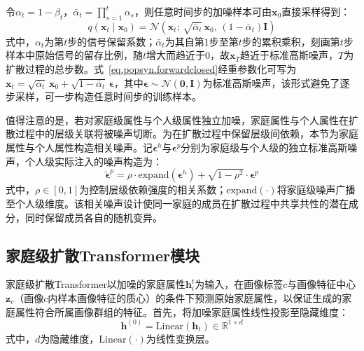 令$\alpha_t = 1 - \beta_t$，$\bar{\alpha}_t = \prod_{s=1}^{t}\alpha_s$，则任意时间步的加噪样本可由$\mathbf{x}_0$直接采样得到：
\begin{equation}
  q(\mathbf{x}_t \mid \mathbf{x}_0) = \mathcal{N}\left(\mathbf{x}_t;\, \sqrt{\bar{\alpha}_t}\,\mathbf{x}_0,\, (1-\bar{\alpha}_t)\mathbf{I}\right)
  \label{eq.popsyn.forwardclosed}
\end{equation}
式中，$\alpha_t$为第$t$步的信号保留系数；$\bar{\alpha}_t$为其自第$1$步至第$t$步的累积乘积，刻画第$t$步样本中原始信号的留存比例，随$t$增大而趋近于$0$，故$\mathbf{x}_T$趋近于标准高斯噪声，$T$为扩散过程的总步数。式~\eqref{eq.popsyn.forwardclosed}经重参数化可写为$\mathbf{x}_t = \sqrt{\bar{\alpha}_t}\,\mathbf{x}_0 + \sqrt{1-\bar{\alpha}_t}\,\boldsymbol{\epsilon}$，其中$\boldsymbol{\epsilon} \sim \mathcal{N}(\mathbf{0}, \mathbf{I})$为标准高斯噪声，该形式避免了逐步采样，可一步构造任意时间步的训练样本。
 
值得注意的是，若对家庭级属性与个人级属性独立加噪，家庭属性与个人属性在扩散过程中的层级关联将被噪声切断。为在扩散过程中保留层级间依赖，本节为家庭属性与个人属性构造相关噪声。记$\boldsymbol{\epsilon}^h$与$\boldsymbol{\epsilon}^p$分别为家庭级与个人级的独立标准高斯噪声，个人级实际注入的噪声构造为：
\begin{equation}
  \tilde{\boldsymbol{\epsilon}}^{p} = \rho \cdot \mathrm{expand}\left(\boldsymbol{\epsilon}^{h}\right) + \sqrt{1-\rho^{2}} \cdot \boldsymbol{\epsilon}^{p}
  \label{eq.popsyn.corrnoise}
\end{equation}
式中，$\rho \in [0, 1]$为控制层级依赖强度的相关系数；$\mathrm{expand}(\cdot)$将家庭级噪声广播至个人级维度。该相关噪声设计使同一家庭的成员在扩散过程中共享共性的潜在成分，同时保留成员各自的随机变异。
 
\subsection{家庭级扩散Transformer模块}\label{subsec.popsyn.model.hhdit}
 
家庭级扩散Transformer以加噪的家庭属性$\mathbf{h}_i^{t}$为输入，在画像标签$c$与画像特征中心$\mathbf{z}_c$（画像$c$内样本画像特征的质心）的条件下预测原始家庭属性，以保证生成的家庭属性符合所属画像群组的特征。首先，将加噪家庭属性线性投影至隐藏维度：
\begin{equation}
  \mathbf{h}^{(0)} = \mathrm{Linear}\left(\mathbf{h}_t\right) \in \mathbb{R}^{1 \times d}
  \label{eq.popsyn.hproj}
\end{equation}
式中，$d$为隐藏维度，$\mathrm{Linear}(\cdot)$为线性变换层。
 
